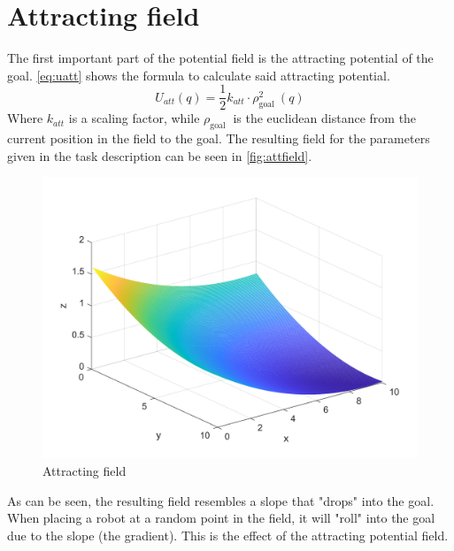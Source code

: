 \documentclass[11pt]{article}
\begin{document}
    \section{Attracting field}\label{sec:attracting-field}
    The first important part of the potential field is the attracting potential of the goal.
    \autoref{eq:uatt} shows the formula to calculate said attracting potential.
    \begin{equation}\label{eq:uatt}
        U_{a t t}(q)=\frac{1}{2} k_{a t t} \cdot \rho_{\text {goal }}^{2}(q)
    \end{equation}
    Where $k_{a t t }$ is a scaling factor, while $\rho_{\text {goal }}$ is the euclidean distance from the current position in the field to the goal.
    The resulting field for the parameters given in the task description can be seen in \autoref{fig:attfield}.
    \begin{figure}[H]
        \centering
        \includegraphics[width=1.0\textwidth]{../test/images/u_att}
        \caption{Attracting field}
        \label{fig:attfield}
    \end{figure}
    As can be seen, the resulting field resembles a slope that "drops" into the goal.
    When placing a robot at a random point in the field, it will "roll" into the goal due to the slope (the gradient).
    This is the effect of the attracting potential field.
\end{document}
